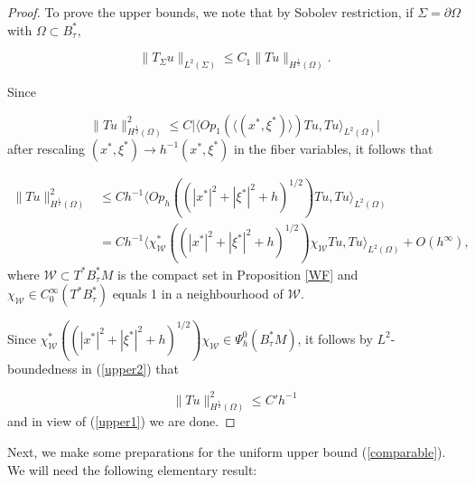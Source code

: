 \documentclass[11pt,reqno]{amsart}
\theoremstyle{definition}
\begin{document}
\begin{proof}
    
To prove the upper bounds, we note that by Sobolev restriction, if $\Sigma = \partial \Omega$ with $\Omega \subset B_\tau^*,$ 

\begin{equation} \label{upper1}
\| T_{\Sigma} u \|_{L^2(\Sigma)} \leq C_1 \| T u \|_{H^{\frac{1}{2}}(\Omega)}.
\end{equation}

Since 

$$ \| T u \|_{H^{\frac{1}{2}}(\Omega)}^2 \leq C  \big| \langle Op_1 ( \langle (x^*,\xi^*) \rangle) T u, Tu \rangle_{L^2(\Omega)} \big|$$
after rescaling $(x^*,\xi^*) \to h^{-1} (x^*,\xi^*)$ in the fiber variables, it follows that

\begin{align} \label{upper2}
 \| T u \|_{H^{\frac{1}{2}}(\Omega)}^2 
 &\leq C h^{-1} \langle Op_h ( ( |x^*|^2  +  |\xi^*|^2 + h )^{1/2} ) T u, Tu \rangle_{L^2(\Omega)} \nonumber \\
  &= C h^{-1} \langle \chi_{{\mathcal W}}^*  ( ( |x^*|^2 + |\xi^*|^2 + h )^{1/2} ) \chi_{{\mathcal W}} T u, Tu \rangle_{L^2(\Omega)} + O(h^{\infty}),
 \end{align}
where ${\mathcal W} \subset T^*B_{\tau}^*M$ is the compact set in Proposition \ref{WF} and $\chi_{{\mathcal W}} \in C^{\infty}_0(T^*B_{\tau}^*)$ equals 1 in a neighbourhood of ${\mathcal W}.$
    
Since $\chi_{{\mathcal W}}^*  ( ( |x^*|^2 + |\xi^*|^2 + h )^{1/2} ) \chi_{{\mathcal W}} \in \Psi_h^0(B_\tau^*M)$, it follows by $L^2$-boundedness in (\ref{upper2}) that
    
$$
\| T u \|_{H^{\frac{1}{2}}(\Omega)}^2 \leq C' h^{-1}
$$
and  in view of (\ref{upper1}) we are done.

\end{proof}

Next, we make some preparations for the uniform upper bound (\ref{comparable}). We will need the following elementary result:
\end{document}
